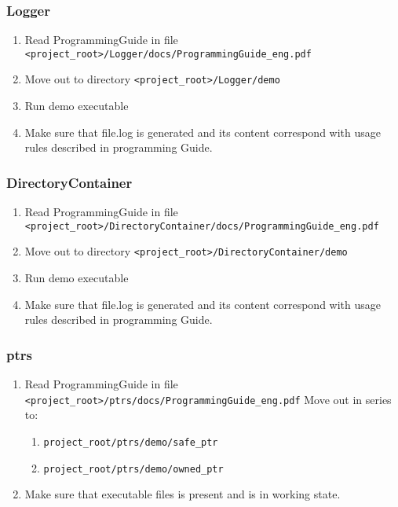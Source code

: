 \documentclass[10pt]{article}
\begin{document}
\subsubsection{ Logger }

\begin{enumerate}
 \item Read ProgrammingGuide in file \newline \verb|<project_root>/Logger/docs/ProgrammingGuide_eng.pdf|
 \item Move out to directory \verb|<project_root>/Logger/demo|
 \item Run demo executable
 \item Make sure that file.log is generated and its content correspond with usage rules
 described in programming Guide.
\end{enumerate}

\subsubsection{ DirectoryContainer }

\begin{enumerate}
 \item Read ProgrammingGuide in file \newline \verb|<project_root>/DirectoryContainer/docs/ProgrammingGuide_eng.pdf|
 \item Move out to directory \verb|<project_root>/DirectoryContainer/demo|
 \item Run demo executable
 \item Make sure that file.log is generated and its content correspond with usage rules
 described in programming Guide.
\end{enumerate}

\subsubsection{ ptrs }
 \begin{enumerate}
 \item Read ProgrammingGuide in file \newline \verb|<project_root>/ptrs/docs/ProgrammingGuide_eng.pdf|
  Move out in series to:
  \begin{enumerate} 
  \item \verb|project_root/ptrs/demo/safe_ptr|
  \item \verb|project_root/ptrs/demo/owned_ptr|
  \end{enumerate}
  \item Make sure that executable files is present and is in working state.
  \end{enumerate}
\end{document}
